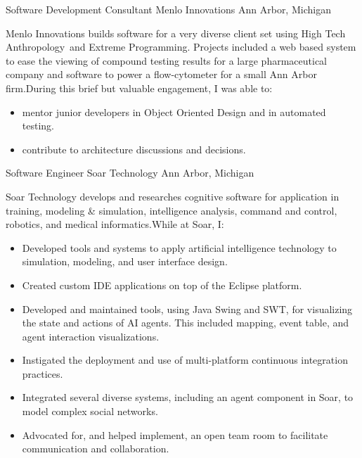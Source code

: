 \documentclass[11pt,letterpaper]{moderncv}
\begin{document}
  {Software Development Consultant} {Menlo Innovations} {Ann Arbor, Michigan} {} {%
  Menlo Innovations builds software for a very diverse client set using High
  Tech Anthropology\textregistered \ and Extreme Programming.  Projects
  included a web based system to ease the viewing of compound testing results
  for a large pharmaceutical company and software to power a flow-cytometer
  for a small Ann Arbor firm.\newline During this brief but valuable engagement, I
  was able to:
  \begin{itemize}
  \item mentor junior developers in Object Oriented Design and in
    automated testing.
  \item contribute to architecture discussions and decisions.
\end{itemize}}

 {Software Engineer} {Soar Technology} {Ann Arbor, Michigan} {} {%
  Soar Technology develops and researches cognitive software for application
  in training, modeling \& simulation, intelligence analysis, command and
  control, robotics, and medical informatics.\newline While at Soar, I:
  \begin{itemize}
  \item Developed tools and systems to apply artificial intelligence
    technology to simulation, modeling, and user interface design.
  \item Created custom IDE applications on top of the Eclipse platform.
  \item Developed and maintained tools, using Java Swing and SWT, for
    visualizing the state and actions of AI agents. This included
    mapping, event table, and agent interaction visualizations.
  \item Instigated the deployment and use of multi-platform
    continuous integration practices.
  \item Integrated several diverse systems, including an agent
    component in Soar, to model complex social networks.
  \item Advocated for, and helped implement, an open team room to
    facilitate communication and collaboration.
\end{itemize}}
\end{document}
